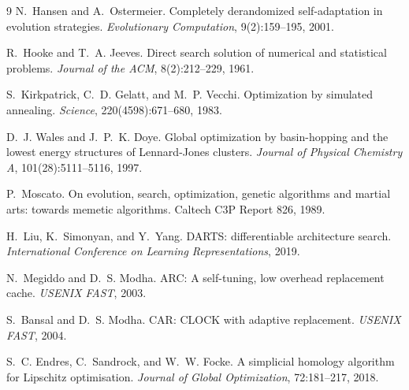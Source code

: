 \documentclass[11pt]{article}
\begin{document}
\begin{thebibliography}{9}
 N.~Hansen and A.~Ostermeier.
Completely derandomized self-adaptation in evolution strategies.
\emph{Evolutionary Computation}, 9(2):159--195, 2001.

 R.~Hooke and T.~A. Jeeves.
Direct search solution of numerical and statistical problems.
\emph{Journal of the ACM}, 8(2):212--229, 1961.

 S.~Kirkpatrick, C.~D. Gelatt, and M.~P. Vecchi.
Optimization by simulated annealing.
\emph{Science}, 220(4598):671--680, 1983.

 D.~J. Wales and J.~P.~K. Doye.
Global optimization by basin-hopping and the lowest energy structures of
Lennard-Jones clusters.
\emph{Journal of Physical Chemistry A}, 101(28):5111--5116, 1997.

 P.~Moscato.
On evolution, search, optimization, genetic algorithms and martial arts:
towards memetic algorithms.
Caltech C3P Report 826, 1989.

 H.~Liu, K.~Simonyan, and Y.~Yang.
DARTS: differentiable architecture search.
\emph{International Conference on Learning Representations}, 2019.

 N.~Megiddo and D.~S. Modha.
{ARC}: A self-tuning, low overhead replacement cache.
\emph{USENIX FAST}, 2003.

 S.~Bansal and D.~S. Modha.
{CAR}: {CLOCK} with adaptive replacement.
\emph{USENIX FAST}, 2004.

 S.~C. Endres, C.~Sandrock, and W.~W. Focke.
A simplicial homology algorithm for Lipschitz optimisation.
\emph{Journal of Global Optimization}, 72:181--217, 2018.

\end{thebibliography}
\end{document}
